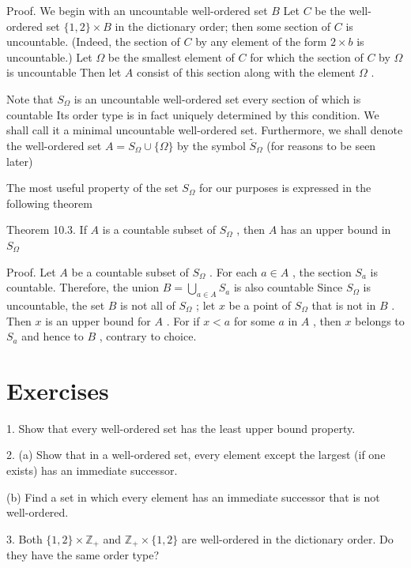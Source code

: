 \documentclass[10pt]{article}
\begin{document}
Proof. We begin with an uncountable well-ordered set \(B\) Let \(C\) be the well-ordered set \(\{ 1,2\}  \times  B\) in the dictionary order; then some section of \(C\) is uncountable. (Indeed, the section of \(C\) by any element of the form \(2 \times  b\) is uncountable.) Let \(\Omega\) be the smallest element of \(C\) for which the section of \(C\) by \(\Omega\) is uncountable Then let \(A\) consist of this section along with the element \(\Omega\) .

Note that \({S}_{\Omega }\) is an uncountable well-ordered set every section of which is countable Its order type is in fact uniquely determined by this condition. We shall call it a minimal uncountable well-ordered set. Furthermore, we shall denote the well-ordered set \(A = {S}_{\Omega } \cup  \{ \Omega \}\) by the symbol \({\widetilde{S}}_{\Omega }\) (for reasons to be seen later)

The most useful property of the set \({S}_{\Omega }\) for our purposes is expressed in the following theorem

Theorem 10.3. If \(A\) is a countable subset of \({S}_{\Omega }\) , then \(A\) has an upper bound in \({S}_{\Omega }\)

Proof. Let \(A\) be a countable subset of \({S}_{\Omega }\) . For each \(a \in  A\) , the section \({S}_{a}\) is countable. Therefore, the union \(B = \mathop{\bigcup }\limits_{{a \in  A}}{S}_{a}\) is also countable Since \({S}_{\Omega }\) is uncountable, the set \(B\) is not all of \({S}_{\Omega }\) ; let \(x\) be a point of \({S}_{\Omega }\) that is not in \(B\) . Then \(x\) is an upper bound for \(A\) . For if \(x < a\) for some \(a\) in \(A\) , then \(x\) belongs to \({S}_{a}\) and hence to \(B\) , contrary to choice.

\section*{Exercises}

1. Show that every well-ordered set has the least upper bound property.

2. (a) Show that in a well-ordered set, every element except the largest (if one exists) has an immediate successor.

(b) Find a set in which every element has an immediate successor that is not well-ordered.

3. Both \(\{ 1,2\}  \times  {\mathbb{Z}}_{ + }\) and \({\mathbb{Z}}_{ + } \times  \{ 1,2\}\) are well-ordered in the dictionary order. Do they have the same order type?
\end{document}
